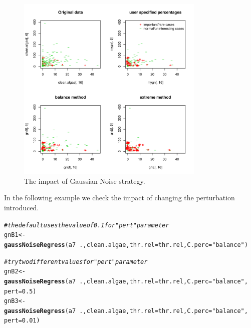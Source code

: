 \documentclass[10pt,a4paper]{article}\usepackage[]{graphicx}\usepackage[]{color}
\makeatletter
\newcommand{\hlnum}[1]{\textcolor[rgb]{0.686,0.059,0.569}{#1}}%
\newcommand{\hlstr}[1]{\textcolor[rgb]{0.192,0.494,0.8}{#1}}%
\newcommand{\hlcom}[1]{\textcolor[rgb]{0.678,0.584,0.686}{\textit{#1}}}%
\newcommand{\hlopt}[1]{\textcolor[rgb]{0,0,0}{#1}}%
\newcommand{\hlstd}[1]{\textcolor[rgb]{0.345,0.345,0.345}{#1}}%
\newcommand{\hlkwb}[1]{\textcolor[rgb]{0.69,0.353,0.396}{#1}}%
\newcommand{\hlkwc}[1]{\textcolor[rgb]{0.333,0.667,0.333}{#1}}%
\newcommand{\hlkwd}[1]{\textcolor[rgb]{0.737,0.353,0.396}{\textbf{#1}}}%
\newenvironment{kframe}{%
 \def\at@end@of@kframe{}%
 \ifinner\ifhmode%
  \def\at@end@of@kframe{\end{minipage}}%
  \begin{minipage}{\columnwidth}%
 \fi\fi%
 \def\FrameCommand##1{\hskip\@totalleftmargin \hskip-\fboxsep
 \colorbox{shadecolor}{##1}\hskip-\fboxsep
     \hskip-\linewidth \hskip-\@totalleftmargin \hskip\columnwidth}%
 \MakeFramed {\advance\hsize-\width
   \@totalleftmargin\z@ \linewidth\hsize
   \@setminipage}}%
 {\par\unskip\endMakeFramed%
 \at@end@of@kframe}
\newenvironment{knitrout}{}{} %
\makeatother
\begin{document}
\begin{knitrout}\footnotesize
{}\color{fgcolor}\begin{figure}

{\centering \includegraphics[width=0.8\textwidth]{figures/UBL-GN_plot2-1} 

}

\caption[The impact of Gaussian Noise strategy]{The impact of Gaussian Noise strategy.}\label{fig:GN_plot2}
\end{figure}


\end{knitrout}



In the following example we check the impact of changing the perturbation introduced.

\begin{knitrout}\footnotesize
{}\color{fgcolor}\begin{kframe}
\begin{alltt}
\hlcom{# the default uses the value of 0.1 for "pert" parameter}
\hlstd{gnB1} \hlkwb{<-} \hlkwd{gaussNoiseRegress}\hlstd{(a7}\hlopt{~}\hlstd{., clean.algae,} \hlkwc{thr.rel}\hlstd{=thr.rel,} \hlkwc{C.perc}\hlstd{=}\hlstr{"balance"}\hlstd{)}

\hlcom{# try two different values for "pert" parameter}
\hlstd{gnB2} \hlkwb{<-} \hlkwd{gaussNoiseRegress}\hlstd{(a7}\hlopt{~}\hlstd{., clean.algae,} \hlkwc{thr.rel}\hlstd{=thr.rel,} \hlkwc{C.perc}\hlstd{=}\hlstr{"balance"}\hlstd{,}
                          \hlkwc{pert}\hlstd{=}\hlnum{0.5}\hlstd{)}
\hlstd{gnB3} \hlkwb{<-} \hlkwd{gaussNoiseRegress}\hlstd{(a7}\hlopt{~}\hlstd{., clean.algae,} \hlkwc{thr.rel}\hlstd{=thr.rel,} \hlkwc{C.perc}\hlstd{=}\hlstr{"balance"}\hlstd{,}
                          \hlkwc{pert}\hlstd{=}\hlnum{0.01}\hlstd{)}
\end{alltt}
\end{kframe}
\end{knitrout}
\end{document}
